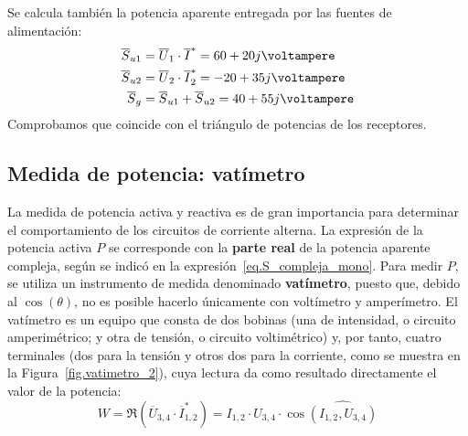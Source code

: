 \begin{example}
          Se calcula también la potencia aparente entregada por las
          fuentes de alimentación:
          \begin{align*}
            \overline{S}_{u1}&=\overline{U}_1\cdot \overline{I}^*= 60 + 20j\unit{\voltampere}\\
            \overline{S}_{u2}&=\overline{U}_2\cdot \overline{I}_2^*= -20 + 35j\unit{\voltampere}\\
            \overline{S}_g &= \overline{S}_{u1} + \overline{S}_{u2} = 40 + 55j\unit{\voltampere}
          \end{align*}
          Comprobamos que coincide con el triángulo de potencias de los receptores.
                        
	\end{example}
	
	\subsection{Medida de potencia: vatímetro}\label{sec.medida_potencia}
	
	La medida de potencia activa y reactiva es de gran importancia para determinar el comportamiento de los circuitos de corriente alterna. La expresión de la potencia activa $P$ se corresponde con la \textbf{parte real} de la potencia aparente compleja, según se indicó en la expresión~\eqref{eq.S_compleja_mono}. Para medir $P$, se utiliza un instrumento de medida denominado \textbf{vatímetro}, puesto que, debido al $\cos(\theta)$, no es posible hacerlo únicamente con voltímetro y amperímetro. El vatímetro es un equipo que consta de dos bobinas (una de intensidad, o circuito amperimétrico; y otra de tensión, o circuito voltimétrico) y, por tanto, cuatro terminales (dos para la tensión y otros dos para la corriente, como se muestra en la Figura~\ref{fig.vatimetro_2}), cuya lectura da como resultado directamente el valor de la potencia:
	\begin{equation*}
	    W=\Re(\overline{U}_{3,4} \cdot \overline{I}_{1,2}^*)=I_{1,2}\cdot U_{3,4}\cdot \cos\widehat{(I_{1,2}, U_{3,4})}
	\end{equation*}%
	

